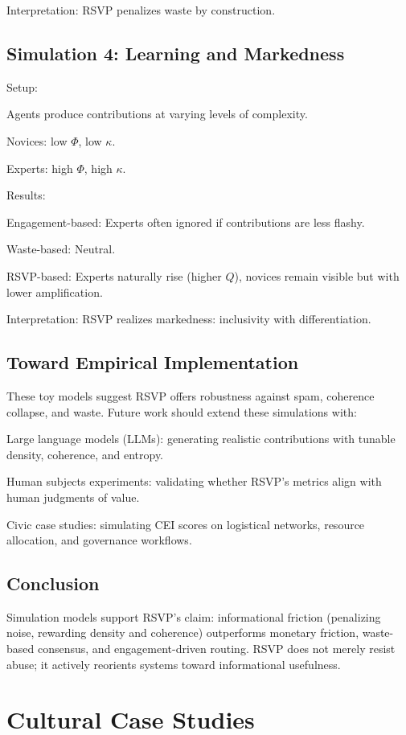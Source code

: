 \documentclass{book}
\begin{document}
Interpretation: RSVP penalizes waste by construction.

\section{Simulation 4: Learning and Markedness}

Setup:

Agents produce contributions at varying levels of complexity.

Novices: low \( \Phi \), low \( \kappa \).

Experts: high \( \Phi \), high \( \kappa \).

Results:

Engagement-based: Experts often ignored if contributions are less flashy.

Waste-based: Neutral.

RSVP-based: Experts naturally rise (higher \( Q \)), novices remain visible but with lower amplification.

Interpretation: RSVP realizes markedness: inclusivity with differentiation.

\section{Toward Empirical Implementation}

These toy models suggest RSVP offers robustness against spam, coherence collapse, and waste. Future work should extend these simulations with:

Large language models (LLMs): generating realistic contributions with tunable density, coherence, and entropy.

Human subjects experiments: validating whether RSVP’s metrics align with human judgments of value.

Civic case studies: simulating CEI scores on logistical networks, resource allocation, and governance workflows.

\section{Conclusion}

Simulation models support RSVP’s claim: informational friction (penalizing noise, rewarding density and coherence) outperforms monetary friction, waste-based consensus, and engagement-driven routing. RSVP does not merely resist abuse; it actively reorients systems toward informational usefulness.

\chapter{Cultural Case Studies}
\end{document}
